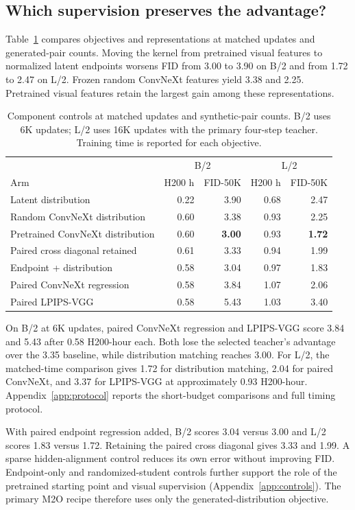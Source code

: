 \documentclass{article}
\begin{document}
\subsection{Which supervision preserves the advantage?}
Table~\ref{tab:main} compares objectives and representations at matched
updates and generated-pair counts. Moving the kernel from pretrained
visual features to normalized latent endpoints worsens FID from 3.00 to
3.90 on B/2 and from 1.72 to 2.47 on L/2. Frozen random ConvNeXt features
yield 3.38 and 2.25. Pretrained visual features retain the largest gain
among these representations.

\begin{table}[t]
\centering
\caption{Component controls at matched updates and synthetic-pair counts.
B/2 uses 6K updates; L/2 uses 16K updates with the primary four-step teacher.
Training time is reported for each objective.}
\begin{tabular}{lrrrr}
\toprule
& \multicolumn{2}{c}{B/2} & \multicolumn{2}{c}{L/2} \\
Arm & H200 h & FID-50K & H200 h & FID-50K \\
\midrule
Latent distribution & 0.22 & 3.90 & 0.68 & 2.47 \\
Random ConvNeXt distribution & 0.60 & 3.38 & 0.93 & 2.25 \\
Pretrained ConvNeXt distribution & 0.60 & \textbf{3.00} & 0.93 & \textbf{1.72} \\
Paired cross diagonal retained & 0.61 & 3.33 & 0.94 & 1.99 \\
Endpoint + distribution & 0.58 & 3.04 & 0.97 & 1.83 \\
Paired ConvNeXt regression & 0.58 & 3.84 & 1.07 & 2.06 \\
Paired LPIPS-VGG & 0.58 & 5.43 & 1.03 & 3.40 \\
\bottomrule
\end{tabular}
\label{tab:main}
\end{table}

On B/2 at 6K updates, paired ConvNeXt regression and LPIPS-VGG score
3.84 and 5.43 after 0.58 H200-hour each. Both lose the selected teacher's
advantage over the 3.35 baseline, while distribution matching reaches 3.00.
For L/2, the matched-time comparison gives 1.72 for distribution matching,
2.04 for paired ConvNeXt, and 3.37 for LPIPS-VGG at approximately
0.93 H200-hour. Appendix~\ref{app:protocol} reports the short-budget
comparisons and full timing protocol.

With paired endpoint regression added, B/2 scores 3.04 versus 3.00
and L/2 scores 1.83 versus 1.72. Retaining the paired cross
diagonal gives 3.33 and 1.99. A sparse hidden-alignment control reduces
its own error without improving FID. Endpoint-only and randomized-student
controls further support the role of the pretrained starting point and
visual supervision (Appendix~\ref{app:controls}). The primary M2O recipe
therefore uses only the generated-distribution objective.
\end{document}
